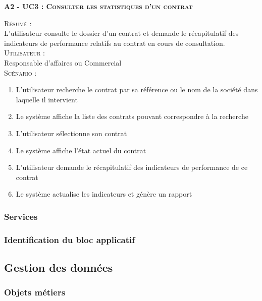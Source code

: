 \noindent\textsc{\bf{A2 - UC3 :} Consulter les statistiques d’un contrat}
\begin{shaded}
\noindent\textsc{Résumé :}\\

L’utilisateur consulte le dossier d’un contrat et demande le récapitulatif des indicateurs de performance relatifs au contrat en cours de consultation. \\

\noindent\textsc{Utilisateur :}\\

Responsable d’affaires ou Commercial \\

\noindent\textsc{Scénario :} \\
\begin{enumerate}
    \item L’utilisateur recherche le contrat par sa référence ou le nom de la société dans laquelle il intervient
    \item Le système affiche la liste des contrats pouvant correspondre à la recherche
    \item L’utilisateur sélectionne son contrat
    \item Le système affiche l’état actuel du contrat
    \item L’utilisateur demande le récapitulatif des indicateurs de performance de ce contrat
    \item Le système actualise les indicateurs et génère un rapport
\end{enumerate}
\end{shaded}

\subsubsection{Services}


\subsubsection{Identification du bloc applicatif}


\subsection{Gestion des données}

\subsubsection{Objets métiers}

